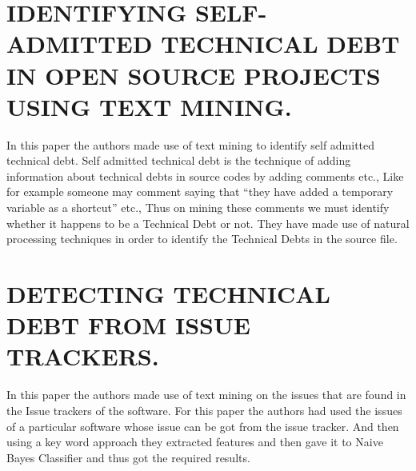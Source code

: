 \section{\uppercase{Identifying Self-Admitted Technical Debt in Open Source Projects Using Text Mining.}}
In this paper the authors made use of text mining to identify self admitted technical debt. Self admitted technical debt is the technique of adding information about technical debts in source codes by adding comments etc., Like for example someone may comment saying that “they have added a temporary variable as a shortcut” etc., Thus on mining these comments we must identify whether it happens to be a Technical Debt or not. They have made use of natural processing techniques in order to identify the Technical Debts in the source file.
\section{\uppercase{Detecting Technical Debt from Issue Trackers.}}
In this paper the authors made use of text mining on the issues that are found in the Issue trackers of the software. For this paper the authors had used the issues of a particular software whose issue can be got from the issue tracker. And then using a key word approach they extracted features and then gave it to Naive Bayes Classifier and thus got the required results.
